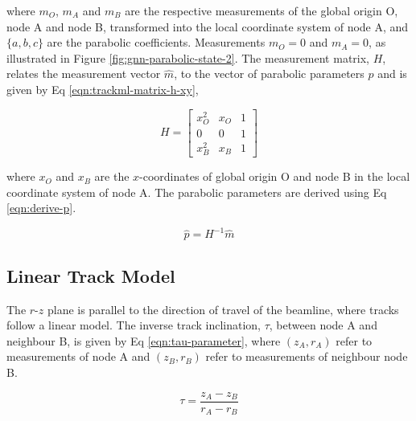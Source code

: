 where $m_O$, $m_A$ and $m_B$ are the respective measurements of the global origin O, node A and node B, transformed into the local coordinate system of node A, and $\{a, b, c\}$ are the parabolic coefficients. Measurements $m_O = 0$ and $m_A = 0$, as illustrated in Figure \ref{fig:gnn-parabolic-state-2}. The measurement matrix, $H$, relates the measurement vector $\hat{m}$, to the vector of parabolic parameters $\hat{p}$ and is given by Eq \eqref{eqn:trackml-matrix-h-xy},

\begin{equation}
    H = \begin{bmatrix} x_O^{2} & x_O & 1 \\ 0 & 0 & 1 \\ x_B^{2} & x_B & 1 \end{bmatrix} 
    \label{eqn:trackml-matrix-h-xy}
\end{equation}

where $x_O$ and $x_B$ are the $x$-coordinates of global origin O and node B in the local coordinate system of node A. The parabolic parameters are derived using Eq \eqref{eqn:derive-p}.

\begin{equation}
    \hat{p} = H^{-1} \hat{m} 
    \label{eqn:derive-p}
\end{equation}




\subsection{Linear Track Model}
\label{linear-state}

The $r$-$z$ plane is parallel to the direction of travel of the beamline, where tracks follow a linear model. The inverse track inclination, $\tau$, between node A and neighbour B, is given by Eq \eqref{eqn:tau-parameter}, where $(z_A, r_A)$ refer to measurements of node A and $(z_B, r_B)$ refer to measurements of neighbour node B.

\begin{equation}
\tau = \frac{z_A - z_B}{r_A - r_B}
\label{eqn:tau-parameter}
\end{equation}

